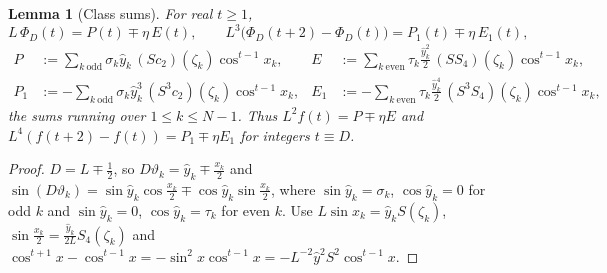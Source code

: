 \documentclass[11pt,a4paper]{article}
\newtheorem{lemma}[theorem]{Lemma}
\theoremstyle{definition}
\theoremstyle{remark}
\begin{document}
\begin{lemma}[Class sums]\label{lem:classsums}
For real $t\ge1$,
\[
  L\,\Phi_D(t)=P(t)\mp\eta\,E(t),\qquad L^3\bigl(\Phi_D(t+2)-\Phi_D(t)\bigr)=P_1(t)\mp\eta\,E_1(t),
\]
\begin{align*}
 P&:=\sum_{k\ \mathrm{odd}}\sigma_k\hat y_k\,(Sc_2)(\zeta_k)\cos^{t-1}x_k, &
 E&:=\sum_{k\ \mathrm{even}}\tau_k\frac{\hat y_k^2}2\,(SS_4)(\zeta_k)\cos^{t-1}x_k,\\
 P_1&:=-\sum_{k\ \mathrm{odd}}\sigma_k\hat y_k^3\,(S^3c_2)(\zeta_k)\cos^{t-1}x_k,&
 E_1&:=-\sum_{k\ \mathrm{even}}\tau_k\frac{\hat y_k^4}2\,(S^3S_4)(\zeta_k)\cos^{t-1}x_k,
\end{align*}
the sums running over $1\le k\le N-1$. Thus $L^2f(t)=P\mp\eta E$ and $L^4(f(t+2)-f(t))=P_1\mp\eta E_1$ for integers
$t\equiv D$.
\end{lemma}
\begin{proof}
$D=L\mp\frac12$, so $D\vartheta_k=\hat y_k\mp\frac{x_k}2$ and
$\sin(D\vartheta_k)=\sin\hat y_k\cos\frac{x_k}2\mp\cos\hat y_k\sin\frac{x_k}2$, where $\sin\hat y_k=\sigma_k$,
$\cos\hat y_k=0$ for odd $k$ and $\sin\hat y_k=0$, $\cos\hat y_k=\tau_k$ for even $k$. Use $L\sin x_k=\hat y_kS(\zeta_k)$,
$\sin\frac{x_k}2=\frac{\hat y_k}{2L}S_4(\zeta_k)$ and $\cos^{t+1}x-\cos^{t-1}x=-\sin^2x\cos^{t-1}x=-L^{-2}\hat y^2S^2\cos^{t-1}x$.
\end{proof}
\end{document}
